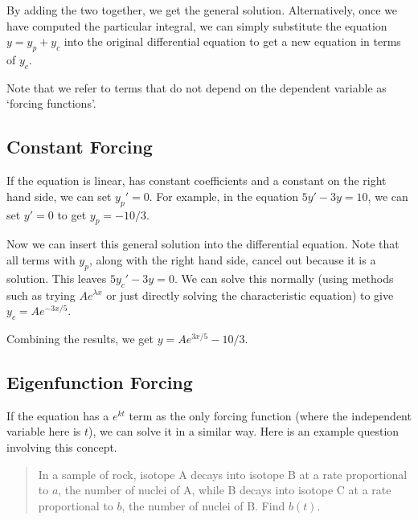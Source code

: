 \documentclass{article}
\begin{document}
By adding the two together, we get the general solution. Alternatively, once we have computed the particular integral, we can simply substitute the equation $y = y_p + y_c$ into the original differential equation to get a new equation in terms of $y_c$.

Note that we refer to terms that do not depend on the dependent variable as `forcing functions'.

\subsection{Constant Forcing}
If the equation is linear, has constant coefficients and a constant on the right hand side, we can set $y_p' = 0$. For example, in the equation $5y' - 3y = 10$, we can set $y' = 0$ to get $y_p = -10/3$.

Now we can insert this general solution into the differential equation. Note that all terms with $y_p$, along with the right hand side, cancel out because it is a solution. This leaves $5y_c' - 3y = 0$. We can solve this normally (using methods such as trying $Ae^{\lambda x}$ or just directly solving the characteristic equation) to give $y_c = Ae^{-3x/5}$.

Combining the results, we get $y = Ae^{3x/5} - 10/3$.

\subsection{Eigenfunction Forcing}
If the equation has a $e^{kt}$ term as the only forcing function (where the independent variable here is $t$), we can solve it in a similar way. Here is an example question involving this concept.

\begin{quote}
	In a sample of rock, isotope A decays into isotope B at a rate proportional to $a$, the number of nuclei of A, while B decays into isotope C at a rate proportional to $b$, the number of nuclei of B. Find $b(t)$.
\end{quote}
\end{document}
